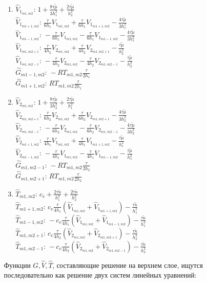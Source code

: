 \documentclass[a4paper]{article}
\theoremstyle{definition}
\numberwithin{equation}{section}
\begin{document}
\begin{enumerate}
\item
$\hat{V}_{1_{m1,m2}} : \, 1+\frac{8\tau \tilde{\mu}}{3h_1^2} + \frac{2\tau \tilde{\mu}}{h_2^2}$\\
$\hat{V}_{1_{m1+1,m2}} : \, \frac{\tau}{6h_1}V_{1_{m1,m2}} + \frac{\tau}{6h_1}V_{1_{m1+1,m2}} - \frac{4\tau\tilde{\mu}}{3h_1^2}$\\
$\hat{V}_{1_{m1-1,m2}} : \, -\frac{\tau}{6h_1}V_{1_{m1,m2}} - \frac{\tau}{6h_1}V_{1_{m1-1,m2}} - \frac{4\tau\tilde{\mu}}{3h_1^2}$\\
$\hat{V}_{1_{m1,m2+1}} : \, \frac{\tau}{4h_2}V_{2_{m1,m2}} + \frac{\tau}{4h_2}V_{2_{m1,m2+1}} - \frac{\tau\tilde{\mu}}{h_2^2}$\\
$\hat{V}_{1_{m1,m2-1}} : \, -\frac{\tau}{4h_2}V_{2_{m1,m2}} - \frac{\tau}{4h_2}V_{2_{m1,m2-1}} - \frac{\tau\tilde{\mu}}{h_2^2}$\\
$\hat{G}_{m1-1,m2} : \, -RT_{m1,m2}\frac{\tau}{2h_1}$\\
$\hat{G}_{m1+1,m2} : \, RT_{m1,m2}\frac{\tau}{2h_1}$\\
\item
$\hat{V}_{2_{m1,m2}} : \, 1+\frac{8\tau \tilde{\mu}}{3h_2^2} + \frac{2\tau \tilde{\mu}}{h_1^2}$\\
$\hat{V}_{2_{m1,m2+1}} : \, \frac{\tau}{6h_2}V_{2_{m1,m2}} + \frac{\tau}{6h_2}V_{2_{m1,m2+1}} - \frac{4\tau\tilde{\mu}}{3h_2^2}$\\
$\hat{V}_{2_{m1,m2-1}} : \, -\frac{\tau}{6h_2}V_{2_{m1,m2}} - \frac{\tau}{6h_2}V_{2_{m1,m2-1}} - \frac{4\tau\tilde{\mu}}{3h_2^2}$\\
$\hat{V}_{2_{m1+1,m2}} : \, \frac{\tau}{4h_1}V_{1_{m1,m2}} + \frac{\tau}{4h_1}V_{1_{m1+1,m2}} - \frac{\tau\tilde{\mu}}{h_1^2}$\\
$\hat{V}_{2_{m1-1,m2}} : \, -\frac{\tau}{4h_1}V_{1_{m1,m2}} - \frac{\tau}{4h_1}V_{1_{m1-1,m2}} - \frac{\tau\tilde{\mu}}{h_1^2}$\\
$\hat{G}_{m1,m2-1} : \, -RT_{m1,m2}\frac{\tau}{2h_2}$\\
$\hat{G}_{m1,m2+1} : \, RT_{m1,m2}\frac{\tau}{2h_2}$\\
\item
$\hat{T}_{m1,m2} : \, c_v + \frac{2\tau \tilde{\kappa}}{h_1^2} + \frac{2\tau \tilde{\kappa}}{h_2^2}$\\
$\hat{T}_{m1+1,m2} : \, c_v\frac{\tau}{4h_1}(\hat{V}_{1_{m1,m2}} + \hat{V}_{1_{m1+1,m2}}) - \frac{\tau\tilde{\kappa}}{h_1^2}$\\
$\hat{T}_{m1-1,m2} : \, -c_v\frac{\tau}{4h_1}(\hat{V}_{1_{m1,m2}} + \hat{V}_{1_{m1-1,m2}}) - \frac{\tau\tilde{\kappa}}{h_1^2}$\\
$\hat{T}_{m1,m2+1} : \, c_v\frac{\tau}{4h_2}(\hat{V}_{2_{m1,m2}} + \hat{V}_{2_{m1,m2+1}}) - \frac{\tau\tilde{\kappa}}{h_2^2}$\\
$\hat{T}_{m1,m2-1} : \, -c_v\frac{\tau}{4h_2}(\hat{V}_{2_{m1,m2}} + \hat{V}_{2_{m1,m2-1}}) - \frac{\tau\tilde{\kappa}}{h_2^2}$\\
\end{enumerate}
\newpage
Функции $\hat{G}, \hat{V}, \hat{T}$, составляющие решение на верхнем слое, ищутся последовательно как решение двух систем линейных уравнений:
\end{document}
